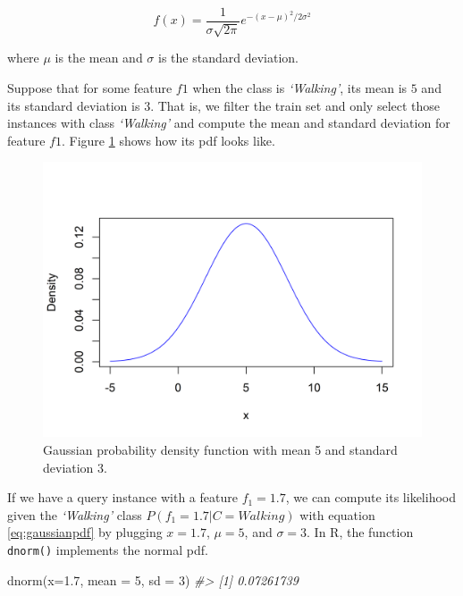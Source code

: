 \documentclass[
  11pt,
]{krantz}
\newenvironment{Shaded}{\begin{snugshade}}{\end{snugshade}}
\newcommand{\AttributeTok}[1]{\textcolor[rgb]{0.61,0.61,0.61}{#1}}
\newcommand{\CommentTok}[1]{\textcolor[rgb]{0.37,0.37,0.37}{\textit{#1}}}
\newcommand{\DecValTok}[1]{\textcolor[rgb]{0.06,0.06,0.06}{#1}}
\newcommand{\FloatTok}[1]{\textcolor[rgb]{0.06,0.06,0.06}{#1}}
\newcommand{\FunctionTok}[1]{\textcolor[rgb]{0,0,0}{#1}}
\newcommand{\NormalTok}[1]{#1}
\begin{document}
\begin{equation}
  f(x) = \frac{1}{{\sigma \sqrt {2\pi } }}e^{ - \left( {x - \mu } \right)^2 / 2 \sigma ^2 }
  \label{eq:gaussianpdf}
\end{equation}

where \(\mu\) is the mean and \(\sigma\) is the standard deviation.

Suppose that for some feature \(f1\) when the class is \emph{`Walking'}, its mean is \(5\) and its standard deviation is \(3\). That is, we filter the train set and only select those instances with class \emph{`Walking'} and compute the mean and standard deviation for feature \(f1\). Figure \ref{fig:pdf1} shows how its pdf looks like.

\begin{figure}

{\centering \includegraphics[width=0.9\linewidth]{images/pdf1} 

}

\caption{Gaussian probability density function with mean 5 and standard deviation 3.}\label{fig:pdf1}
\end{figure}

If we have a query instance with a feature \(f_1 = 1.7\), we can compute its likelihood given the \emph{`Walking'} class \(P(f_1=1.7|C=Walking)\) with equation \eqref{eq:gaussianpdf} by plugging \(x=1.7\), \(\mu=5\), and \(\sigma=3\). In R, the function \texttt{dnorm()} implements the normal pdf.

\begin{Shaded}
\begin{Highlighting}[]
\FunctionTok{dnorm}\NormalTok{(}\AttributeTok{x=}\FloatTok{1.7}\NormalTok{, }\AttributeTok{mean =} \DecValTok{5}\NormalTok{, }\AttributeTok{sd =} \DecValTok{3}\NormalTok{)}
\CommentTok{\#\textgreater{} [1] 0.07261739}
\end{Highlighting}
\end{Shaded}
\end{document}
